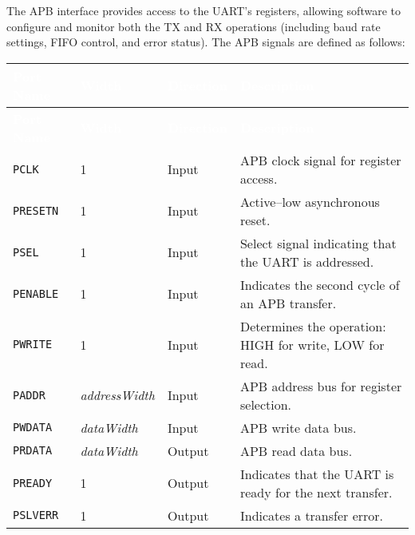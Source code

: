 The APB interface provides access to the UART’s registers, allowing software to configure and monitor both the TX and RX operations (including baud rate settings, FIFO control, and error status). The APB signals are defined as follows:

\renewcommand*{\arraystretch}{1.3}
\begingroup
\small
{}
\begin{longtable}[H]{
  | p{}
  | p{}
  | p{}
  | p{} |
}
\hline
\rowcolor{gray}
\textcolor{white}{\textbf{Port Name}} &
\textcolor{white}{\textbf{Width}} &
\textcolor{white}{\textbf{Direction}} &
\textcolor{white}{\textbf{Description}} \\ \hline
\endfirsthead

\hline
\rowcolor{gray}
\textcolor{white}{\textbf{Port Name}} &
\textcolor{white}{\textbf{Width}} &
\textcolor{white}{\textbf{Direction}} &
\textcolor{white}{\textbf{Description}}\\ \hline
\endhead

\hline
\endfoot

\texttt{PCLK} &
1 &
Input &
APB clock signal for register access. \\ \hline

\texttt{PRESETN} &
1 &
Input &
Active–low asynchronous reset. \\ \hline

\texttt{PSEL} &
1 &
Input &
Select signal indicating that the UART is addressed. \\ \hline

\texttt{PENABLE} &
1 &
Input &
Indicates the second cycle of an APB transfer. \\ \hline

\texttt{PWRITE} &
1 &
Input &
Determines the operation: HIGH for write, LOW for read. \\ \hline

\texttt{PADDR} &
\textit{addressWidth} &
Input &
APB address bus for register selection. \\ \hline

\texttt{PWDATA} &
\textit{dataWidth} &
Input &
APB write data bus. \\ \hline

\texttt{PRDATA} &
\textit{dataWidth} &
Output &
APB read data bus. \\ \hline

\texttt{PREADY} &
1 &
Output &
Indicates that the UART is ready for the next transfer. \\ \hline

\texttt{PSLVERR} &
1 &
Output &
Indicates a transfer error. \\ \hline
\end{longtable}
\label{table:apb_ports}
\endgroup
